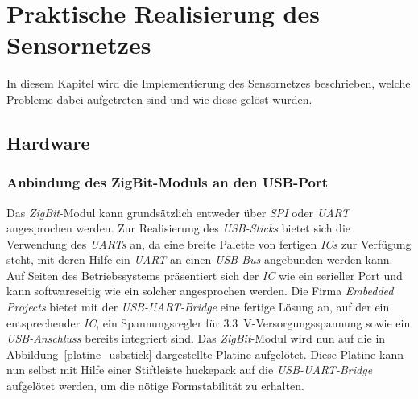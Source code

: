 
\chapter{Praktische Realisierung des Sensornetzes}\label{Implementierung}

In diesem Kapitel wird die Implementierung des Sensornetzes beschrieben, welche Probleme dabei aufgetreten
sind und wie diese gelöst wurden.

\section{Hardware}
\subsection{Anbindung des ZigBit-Moduls an den USB-Port}
Das \emph{ZigBit}-Modul kann grundsätzlich entweder über \emph{SPI} oder \emph{UART} angesprochen werden. 
Zur Realisierung des \emph{USB-Sticks} bietet sich die Verwendung des \emph{UARTs} an, da eine breite Palette 
von fertigen \emph{ICs} zur Verfügung steht, mit deren Hilfe ein \emph{UART} an einen \emph{USB-Bus} angebunden werden 
kann. Auf Seiten des Betriebssystems präsentiert sich der \emph{IC} wie ein serieller Port und kann softwareseitig
wie ein solcher angesprochen werden. Die Firma \emph{Embedded Projects} bietet mit der \emph{USB-UART-Bridge}
eine fertige Lösung an, auf der ein entsprechender \emph{IC}, ein Spannungsregler für 3.3~V-Versorgungsspannung
sowie ein \emph{USB-Anschluss} bereits integriert sind. Das \emph{ZigBit}-Modul wird nun auf die in 
Abbildung~\ref{platine_usbstick} dargestellte Platine aufgelötet. Diese Platine kann nun selbst mit Hilfe einer
Stiftleiste huckepack auf die \emph{USB-UART-Bridge} aufgelötet werden, um die nötige Formstabilität zu erhalten.

